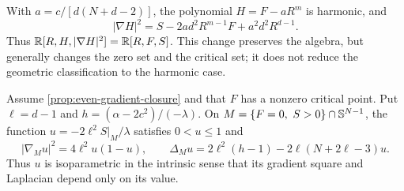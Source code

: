 \begin{remark}
\label{rem:even-harmonic-suspension}
With \(a=c/[d(N+d-2)]\), the polynomial \(H=F-aR^m\)
is harmonic, and
\[
 |\nabla H|^2=S-2ad^2R^{m-1}F+a^2d^2R^{d-1}.
\]
Thus \(\mathbb R[R,H,|\nabla H|^2]=\mathbb R[R,F,S]\).
This change preserves the algebra, but generally changes the zero set
and the critical set; it does not reduce the geometric classification
to the harmonic case.

\end{remark}

\begin{proposition}
\label{prop:even-singular-link-structure}
Assume \cref{prop:even-gradient-closure} and that $F$ has a nonzero
critical point. Put $\ell=d-1$ and
$h=(\alpha-2c^2)/(-\lambda)$. On
$M=\{F=0,\ S>0\}\cap\mathbb S^{N-1}$, the function
$u=-2\ell^2S|_M/\lambda$ satisfies $0<u\le1$ and
\begin{equation}\label{eq:even-normalized-link}
 |\nabla_Mu|^2=4\ell^2u(1-u),\qquad
 \Delta_Mu=2\ell^2(h-1)-2\ell(N+2\ell-3)u.
\end{equation}
Thus $u$ is isoparametric in the intrinsic sense that its gradient
square and Laplacian depend only on its value.
\end{proposition}

